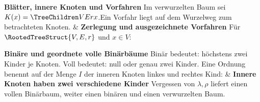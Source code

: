 \begin{BandUebersicht}
\textbf{Blätter, innere Knoten und Vorfahren}
Im verwurzelten Baum sei \(K(x)=\TreeChildren V E r x\).Ein Vorfahr liegt auf dem Wurzelweg zum betrachteten Knoten.
&
\textbf{Zerlegung und ausgezeichnete Vorfahren}
Für \(\RootedTreeStruct{V,E,r}\) und \(x\in V\):
 \\
\addlinespace[.8ex]

\textbf{Binäre und geordnete volle Binärbäume}
Binär bedeutet: höchstens zwei Kinder je Knoten. Voll bedeutet:
null oder genau zwei Kinder. Eine Ordnung benennt auf der Menge \(I\)
der inneren Knoten linkes und rechtes Kind:
&
\textbf{Innere Knoten haben zwei verschiedene Kinder}
Vergessen von \(\lambda,\rho\) liefert einen vollen Binärbaum,
weiter einen binären und einen verwurzelten Baum.
 \\
\addlinespace[.8ex]
\end{BandUebersicht}
